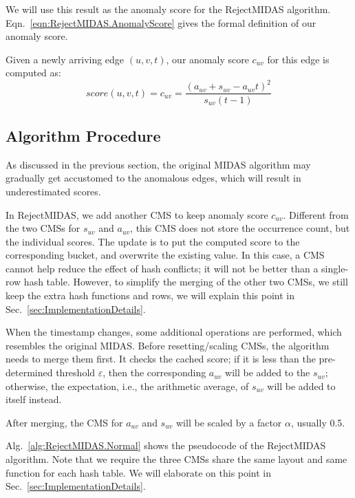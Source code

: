 \documentclass[5p]{elsarticle}
\begin{document}
	We will use this result as the anomaly score for the RejectMIDAS algorithm. Eqn.~\ref{eqn:RejectMIDAS.AnomalyScore} gives the formal definition of our anomaly score.

	\begin{definition}
		Given a newly arriving edge $(u,v,t)$, our anomaly score $c_{uv}$ for this edge is computed as:
		\begin{equation}
			\label{eqn:RejectMIDAS.AnomalyScore}
			score(u,v,t)=c_{uv}=\frac{(a_{uv}+s_{uv}-a_{uv}t)^2}{s_{uv}(t-1)}
		\end{equation}
	\end{definition}

	\subsection{Algorithm Procedure}

	As discussed in the previous section, the original MIDAS algorithm may gradually get accustomed to the anomalous edges, which will result in underestimated scores.

	In RejectMIDAS, we add another CMS to keep anomaly score $c_{uv}$. Different from the two CMSs for $s_{uv}$ and $a_{uv}$, this CMS does not store the occurrence count, but the individual scores. The update is to put the computed score to the corresponding bucket, and overwrite the existing value. In this case, a CMS cannot help reduce the effect of hash conflicts; it will not be better than a single-row hash table. However, to simplify the merging of the other two CMSs, we still keep the extra hash functions and rows, we will explain this point in Sec.~\ref{sec:ImplementationDetails}.

	When the timestamp changes, some additional operations are performed, which resembles the original MIDAS. Before resetting/scaling CMSs, the algorithm needs to merge them first. It checks the cached score; if it is less than the pre-determined threshold $\varepsilon$, then the corresponding $a_{uv}$ will be added to the $s_{uv}$; otherwise, the expectation, i.e., the arithmetic average, of $s_{uv}$ will be added to itself instead.

	After merging, the CMS for $a_{uv}$ and $s_{uv}$ will be scaled by a factor $\alpha$, usually 0.5.

	Alg.~\ref{alg:RejectMIDAS.Normal} shows the pseudocode of the RejectMIDAS algorithm. Note that we require the three CMSs share the same layout and same function for each hash table. We will elaborate on this point in Sec.~\ref{sec:ImplementationDetails}.
\end{document}
